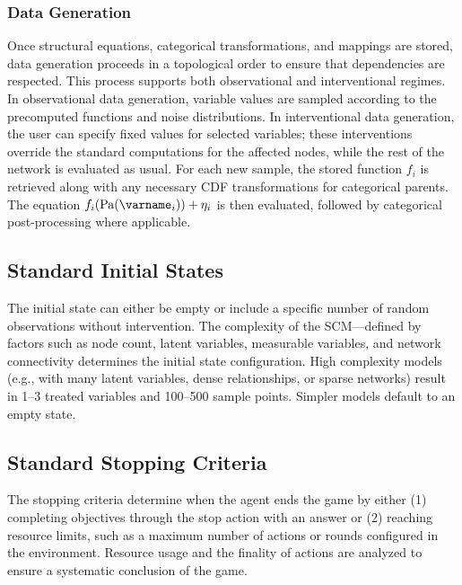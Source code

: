 \documentclass{uai2024} %
\begin{document}
        \subsubsection{Data Generation}
            Once structural equations, categorical transformations, and mappings are stored, data generation proceeds in a topological order to ensure that dependencies are respected. 
            This process supports both observational and interventional regimes. 
            In observational data generation, variable values are sampled according to the precomputed functions and noise distributions. 
            In interventional data generation, the user can specify fixed values for selected variables; these interventions override the standard computations for the affected nodes, while the rest of the network is evaluated as usual. 
            For each new sample, the stored function $ f_i $ is retrieved along with any necessary CDF transformations for categorical parents. 
            The equation \( f_i(\text{Pa}(\varname_i)) + \eta_i \) is then evaluated, followed by categorical post-processing where applicable.



    \subsection{Standard Initial States}
        The initial state can either be empty or include a specific number of random observations without intervention. 
        The complexity of the SCM—defined by factors such as node count, latent variables, measurable variables, and network connectivity determines the initial state configuration. 
        High complexity models (e.g., with many latent variables, dense relationships, or sparse networks) result in 1–3 treated variables and 100–500 sample points. 
        Simpler models default to an empty state.



    \subsection{Standard Stopping Criteria}
        The stopping criteria determine when the agent ends the game by either (1) completing objectives through the stop action with an answer or (2) reaching resource limits, such as a maximum number of actions or rounds configured in the environment. 
        Resource usage and the finality of actions are analyzed to ensure a systematic conclusion of the game.
\end{document}
